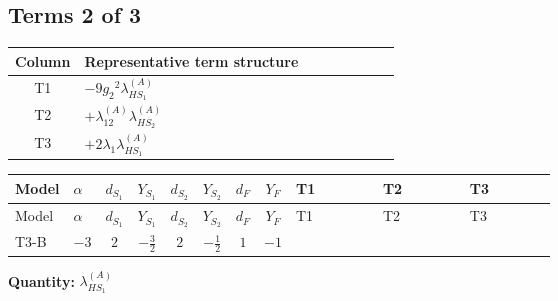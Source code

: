 \documentclass[8pt]{article}
\begin{document}
\begin{landscape}
\subsection*{Terms 2 of 3}
\begin{center}
\begin{tabular}{@{}c >{\raggedright\arraybackslash}p{0.82\linewidth}@{}}
\toprule
Column & Representative term structure \\
\midrule
T1 & \(\displaystyle -9 {g_2}^2 {\lambda_{HS_1}^{(A)}}\) \\
\midrule
T2 & \(\displaystyle +{\lambda_{12}^{(A)}} {\lambda_{HS_2}^{(A)}}\) \\
\midrule
T3 & \(\displaystyle +2 {\lambda_1} {\lambda_{HS_1}^{(A)}}\) \\
\midrule
\bottomrule
\end{tabular}
\end{center}
\smallskip
\tiny
\begin{longtable}{@{}llcccccc >{\raggedright\arraybackslash}p{0.21\linewidth} >{\raggedright\arraybackslash}p{0.21\linewidth} >{\raggedright\arraybackslash}p{0.21\linewidth}@{}}
\toprule
Model & $\alpha$ & $d_{S_1}$ & $Y_{S_1}$ & $d_{S_2}$ & $Y_{S_2}$ & $d_F$ & $Y_F$ & T1 & T2 & T3 \\
\midrule
\endfirsthead
\toprule
Model & $\alpha$ & $d_{S_1}$ & $Y_{S_1}$ & $d_{S_2}$ & $Y_{S_2}$ & $d_F$ & $Y_F$ & T1 & T2 & T3 \\
\midrule
\endhead
T3-B & $-3$ & $2$ & $-\frac{3}{2}$ & $2$ & $-\frac{1}{2}$ & $1$ & $-1$ & \scriptsize\adjustbox{max width=\linewidth}{$\begin{gathered} -9 {g_2}^2 {\lambda_{HS_1}^{(A)}}\end{gathered}$} & \scriptsize\adjustbox{max width=\linewidth}{$\begin{gathered} +{\lambda_{12}^{(A)}} {\lambda_{HS_2}^{(A)}}\end{gathered}$} & \scriptsize\adjustbox{max width=\linewidth}{$\begin{gathered} +2 {\lambda_1} {\lambda_{HS_1}^{(A)}}\end{gathered}$} \\
\midrule
\bottomrule
\end{longtable}
\clearpage
\noindent\textbf{Quantity: }$\lambda_{HS_1}^{(A)}$\par\smallskip

\end{landscape}
\end{document}
